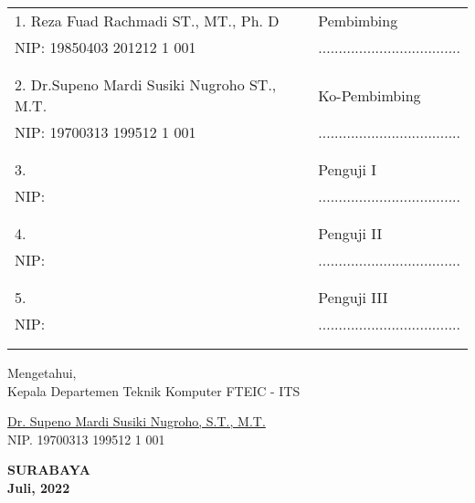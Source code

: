     \noindent
    \begin{tabularx}{\textwidth}{X l}
      1. Reza Fuad Rachmadi ST., MT., Ph. D          & Pembimbing \\
      NIP: 19850403 201212 1 001        & ................................... \\
      &  \\
      &  \\
      2. Dr.Supeno Mardi Susiki Nugroho ST., M.T.     & Ko-Pembimbing \\
      NIP: 19700313 199512 1 001        & ................................... \\
      &  \\
      &  \\
      3.          & Penguji I \\
      NIP:         & ................................... \\
      &  \\
      &  \\
      4.       & Penguji II \\
      NIP:         & ................................... \\
      &  \\
      &  \\
      5.                      & Penguji III \\
      NIP:         & ................................... \\
      &  \\
      &  \\
    \end{tabularx}
  \endgroup


  \begin{center}
    Mengetahui, \\
    Kepala Departemen Teknik Komputer FTEIC - ITS\\

    \vspace{8ex}

    \underline{Dr. Supeno Mardi Susiki Nugroho, S.T., M.T.} \\
    NIP. 19700313 199512 1 001
  \end{center}

  \begin{center}
    \textbf{SURABAYA\\Juli, 2022}
  \end{center}
\endgroup